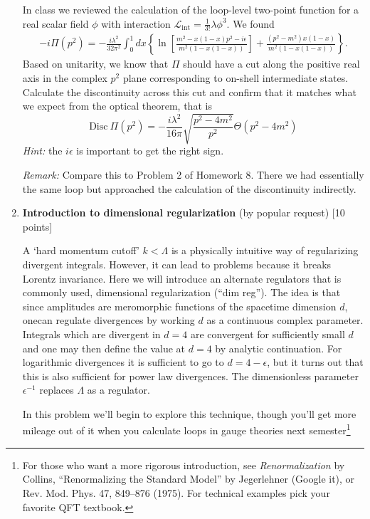 \documentclass[12pt]{article}
\begin{document}
\begin{enumerate}
In class we reviewed the calculation of the loop-level two-point function for a real scalar field $\phi$ with interaction $\mathcal L_\text{int} = \frac 1{3!}\lambda \phi^3$. We found
\begin{align}
-i\Pi(p^2) = -\frac{i\lambda^2}{32\pi^2} \int_0^1 dx
\left\{
\ln \left[
\frac{m^2-x(1-x)p^2 - i\epsilon}{m^2\left(1-x(1-x)\right)}
\right]
+ \frac{(p^2-m^2)x(1-x)}{m^2\left(1-x(1-x)\right)}
\right\}.\label{eq:phi3:Pi}
\end{align}
Based on unitarity, we know that $\Pi$ should have a cut along the positive real axis in the complex $p^2$ plane corresponding to on-shell intermediate states. Calculate the discontinuity across this cut and confirm that it matches what we expect from the optical theorem, that is
\[
\text{Disc}\ \Pi(p^2) = -\frac{i\lambda^2}{16\pi} \sqrt{\frac{p^2-4m^2}{p^2}}\Theta(p^2-4m^2)
\]
\textit{Hint:} the $i\epsilon$ is important to get the right sign.

\textit{Remark:} Compare this to Problem 2 of Homework 8. There we had essentially the same loop but approached the calculation of the discontinuity indirectly.


\item {\bf Introduction to dimensional regularization} (by popular request) [10 points]

A `hard momentum cutoff' $k< \Lambda$ is a physically intuitive way of regularizing divergent integrals. However, it can lead to problems because it breaks Lorentz invariance. Here we will introduce an alternate regulators that is commonly used, dimensional regularization (``dim reg''). The idea is that since amplitudes are meromorphic functions of the spacetime dimension $d$, onecan regulate divergences by working $d$ as a continuous complex parameter. Integrals which are divergent in $d=4$ are convergent for sufficiently small $d$ and one may then define the value at $d=4$ by analytic continuation. For logarithmic divergences it is sufficient to go to $d=4-\epsilon$, but it turns out that this is also sufficient for power law divergences. The dimensionless parameter $\epsilon^{-1}$ replaces $\Lambda$ as a regulator.

In this problem we'll begin to explore this technique, though you'll get more mileage out of it when you calculate loops in gauge theories next semester\footnote{For those who want a more rigorous introduction, see \textit{Renormalization} by Collins, ``Renormalizing the Standard Model'' by Jegerlehner (Google it), or Rev. Mod. Phys. 47, 849–876 (1975). For technical examples pick your favorite QFT textbook.}


\end{enumerate}
\end{document}
